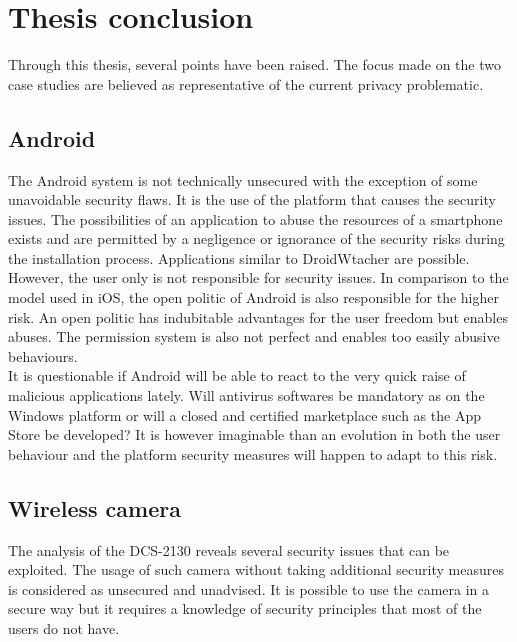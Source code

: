 \chapter{Thesis conclusion}

Through this thesis, several points have been raised.
The focus made on the two case studies are believed as representative of the current privacy problematic.

\section{Android}

The Android system is not technically unsecured with the exception of some unavoidable security flaws.
It is the use of the platform that causes the security issues.
The possibilities of an application to abuse the resources of a smartphone exists and are permitted by a negligence or ignorance of the security risks during the installation process.
Applications similar to DroidWtacher are possible.\\

However, the user only is not responsible for security issues.
In comparison to the model used in iOS, the open politic of Android is also responsible for the higher risk.
An open politic has indubitable advantages for the user freedom but enables abuses.
The permission system is also not perfect and enables too easily abusive behaviours.\\

It is questionable if Android will be able to react to the very quick raise of malicious applications lately.
Will antivirus softwares be mandatory as on the Windows platform or will a closed and certified marketplace such as the App Store be developed?
It is however imaginable than an evolution in both the user behaviour and the platform security measures will happen to adapt to this risk.

\section{Wireless camera}

The analysis of the DCS-2130 reveals several security issues that can be exploited.
The usage of such camera without taking additional security measures is  considered as unsecured and unadvised.
It is possible to use the camera in a secure way but it requires a knowledge of security principles that most of the users do not have.\\

